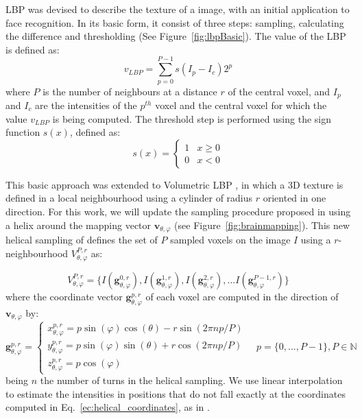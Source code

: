 \ac{LBP} was devised to describe the texture of a image, with an initial application to face recognition. In its basic form, it consist of three steps: sampling, calculating the difference and thresholding (See Figure~\ref{fig:lbpBasic}). The value of the \ac{LBP} is defined as:
\begin{equation}
v_{LBP} = \sum_{p=0}^{P-1} s(I_p - I_c)2^p
\end{equation}
where $P$ is the number of neighbours at a distance $r$ of the central voxel, and $I_p$ and $I_c$ are the intensities of the $p^{th}$ voxel and the central voxel for which the value $v_{LBP}$ is being computed. The threshold step is performed using the sign function $s(x)$, defined as:
\begin{equation} %
s(x) = 
\begin{cases}
1      &  x \geq 0 \\
0      &  x < 0
\end{cases}
\end{equation}

This basic approach was extended to Volumetric \ac{LBP} \cite{Zhao2007}, in which a 3D texture is defined in a local neighbourhood using a cylinder of radius $r$ oriented in one direction. For this work, we will update the sampling procedure proposed in \cite{Zhao2007} using a helix around the mapping vector $\mathbf{v}_{\theta,\varphi}$ (see Figure~\ref{fig:brainmapping}). This new helical sampling of \cite{Martinez-MurciaVRLBP} defines the set of $P$ sampled voxels on the image $I$ using a $r$-neighbourhood $V_{\theta,\varphi}^{P,r}$ as:

\begin{equation}
V_{\theta,\varphi}^{P,r}=\lbrace I(\mathbf{g}_{\theta,\varphi}^{0,r}), I(\mathbf{g}_{\theta,\varphi}^{1,r}), I(\mathbf{g}_{\theta,\varphi}^{2,r}), \dots I(\mathbf{g}_{\theta,\varphi}^{P-1,r})\rbrace
\end{equation} 
where the coordinate vector $\mathbf{g}_{\theta,\varphi}^{p,r}$ of each voxel are computed in the direction of $\mathbf{v}_{\theta,\varphi}$ by: 
\begin{equation}
\label{ec:helical_coordinates}
\mathbf{g}_{\theta,\varphi}^{p,r}=\begin{cases}
x_{\theta,\varphi}^{p,r}=p\sin(\varphi)\cos(\theta)-r\sin(2\pi np/P)\\
y_{\theta,\varphi}^{p,r}=p\sin(\varphi)\sin(\theta)+r\cos(2\pi np/P)\\
z_{\theta,\varphi}^{p,r}=p\cos(\varphi) 
\end{cases} \quad p=\{0,...,P-1\}, P \in \mathbb{N}
\end{equation}
being $n$ the number of turns in the helical sampling. We use linear interpolation to estimate the intensities in positions that do not fall exactly at the coordinates computed in Eq.~\ref{ec:helical_coordinates}, as in \cite{Zhao2007}. 

